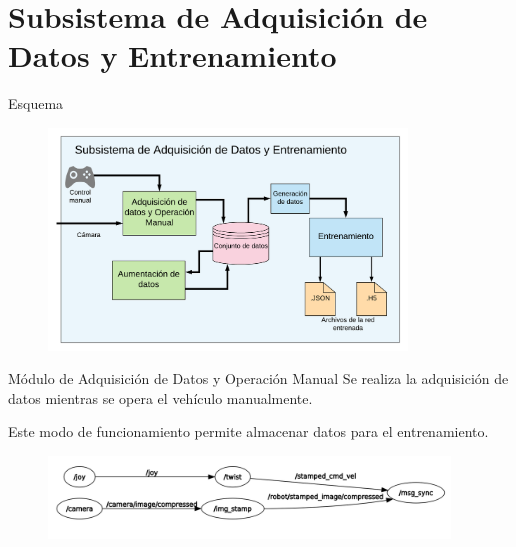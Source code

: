 \documentclass[10pt]{beamer}
\begin{document}
\section{Subsistema de Adquisición de Datos y Entrenamiento}

\begin{frame}{Esquema}
    \begin{figure}[!h] 
        \centering
        \includegraphics[width=0.85\textwidth]{../img/daq_esq}
        \end{figure}
\end{frame}


\begin{frame}{Módulo de Adquisición de Datos y Operación Manual}
    Se realiza la adquisición de datos mientras se opera el vehículo manualmente.
    
    Este modo de funcionamiento permite almacenar datos para el entrenamiento.

    \begin{figure}[!h] 
        \centering
        \includegraphics[width=0.95\textwidth]{../img/nodosdaq}
        \end{figure}
    
\end{frame}
\end{document}
